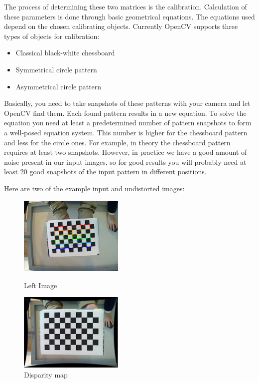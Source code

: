 \documentclass[11pt]{report}
\begin{document}
{{The process of determining these two matrices is the calibration. Calculation of these parameters is done through basic geometrical equations. The equations used depend on the chosen calibrating objects. Currently OpenCV supports three types of objects for calibration:

\begin{itemize}
 \item Classical black-white chessboard
 \item Symmetrical circle pattern
 \item Asymmetrical circle pattern
\end{itemize}

Basically, you need to take snapshots of these patterns with your camera and let OpenCV find them. Each found pattern results in a new equation. To solve the equation you need at least a predetermined number of pattern snapshots to form a well-posed equation system. This number is higher for the chessboard pattern and less for the circle ones. For example, in theory the chessboard pattern requires at least two snapshots. However, in practice we have a good amount of noise present in our input images, so for good results you will probably need at least 20 good snapshots of the input pattern in different positions.

Here are two of the example input and undistorted images:



\begin{figure}
\centering
\parbox{5cm}{
\includegraphics[width=5cm]{normal.jpg}
\caption{Left Image}
\label{fig:2figsA}}
\qquad
\begin{minipage}{5cm}
\includegraphics[width=5cm]{undist.jpg}
\caption{Disparity map}
\label{fig:2figsB}
\end{minipage}
\end{figure}

}}
\end{document}
